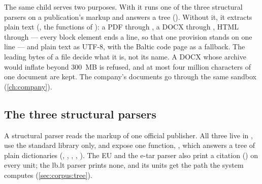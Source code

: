 The same child serves two purposes. With  it runs one of the three
structural parsers on a publication's markup and answers a tree
(). Without it, it extracts plain text
(, the functions of ): a PDF through
, a DOCX through , HTML through  --- every block
element ends a line, so that one provision stands on one line --- and plain text as UTF-8,
with the Baltic code page as a fallback. The leading bytes of a file decide what it is, not
its name. A DOCX whose archive would inflate beyond 300~MB is refused, and at most four
million characters of one document are kept. The company's documents go through the same
sandbox (\cref{ch:company}).

\subsection{The three structural parsers}\label{sec:corpus:parsers}

A structural parser reads the markup of one official publisher. All three live in
, use the standard library only, and expose one function,
, which answers a tree of plain dictionaries
(, , , , ). The EU and the
e-tar parser also print a citation () on every unit; the lb.lt parser prints none,
and its units get the path the system computes (\cref{sec:corpus:tree}).

